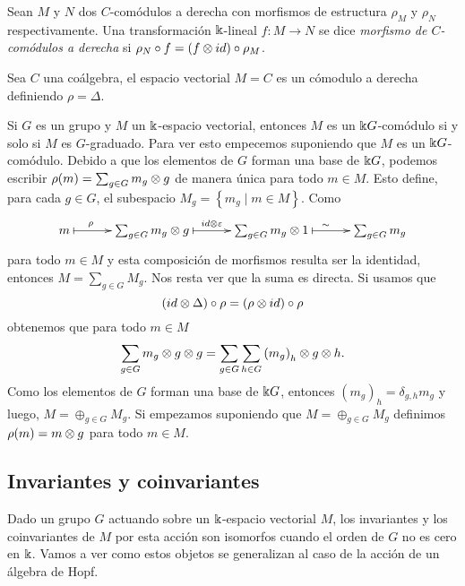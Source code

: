 \documentclass[a4paper,oneside,fleqn,11pt,../tesis.tex]{subfiles}
\begin{document}
\begin{definition}
	Sean $M$ y $N$ dos $C$-comódulos a derecha con morfismos de estructura $\rho_M$ y $\rho_N$ respectivamente.
	Una transformación $\Bbbk$-lineal $f: M \to N$ se dice \emph{morfismo de $C$-comódulos a derecha}
	si $\rho_N \circ f = (f \otimes id) \circ \rho_M$.
\end{definition}

\begin{example}
	Sea $C$ una coálgebra, el espacio vectorial $M = C$ es un cómodulo a derecha definiendo $\rho = \Delta$.
\end{example}


\begin{example} \label{exgroupgrading}
	Si $G$ es un grupo y $M$ un $\Bbbk$-espacio vectorial, entonces $M$ es un $\Bbbk G$-comódulo si y solo si $M$ es $G$-graduado.
	Para ver esto empecemos suponiendo que $M$ es un $\Bbbk G$-comódulo. Debido a que los elementos de $G$ forman
	una base de $\Bbbk G$, podemos escribir $\rho(m) = \sum_{g \in G} m_g \otimes g$ de manera única para todo $m \in M$.
	Esto define, para cada $g \in G$, el subespacio $M_g = \left\lbrace m_g \mid m \in M\right\rbrace$. Como
	\begin{align*}
		\xymatrix@=3em{
			m \ar@{|->}[r]^(.3){\rho} & \sum_{g \in G} m_g \ox g \ar@{|->}[r]^{id \ox \veps}
				& \sum_{g \in G} m_g \ox 1 \ar@{|->}[r]^(.5){\sim} & \sum_{g \in G} m_g
		}
	\end{align*}		 
	para todo $m \in M$ y esta composición de morfismos resulta ser la identidad, entonces $M = \sum_{g \in G} M_g$.
	Nos resta ver que la suma es directa. Si usamos que
	\[
	(id \otimes \Delta) \circ \rho = (\rho \otimes id) \circ \rho
	\]
	obtenemos que para todo $m \in M$
	\[
	\sum_{g \in G} m_g \otimes g \otimes g  = \sum_{g \in G}	\sum_{h \in G} \left({m_g}\right)_{h} \otimes g \otimes h. 
	\]
	Como los elementos de $G$ forman una base de $\Bbbk G$, entonces $({m_g})_h = \delta_{g, h} m_{g}$ y luego, $M = \oplus_{g \in G} M_g$.
	Si empezamos suponiendo que $M = \oplus_{g \in G} M_g$ definimos $\rho(m) = m \otimes g$ para todo $m \in M$.
\end{example}

\subsection{Invariantes y coinvariantes}
Dado un grupo $G$ actuando sobre un $\Bbbk$-espacio vectorial $M$, los invariantes y los coinvariantes de $M$ por esta acción son
isomorfos cuando el orden de $G$ no es cero en $\Bbbk$. Vamos a ver como estos objetos se generalizan al caso de la acción
de un álgebra de Hopf.
\end{document}
